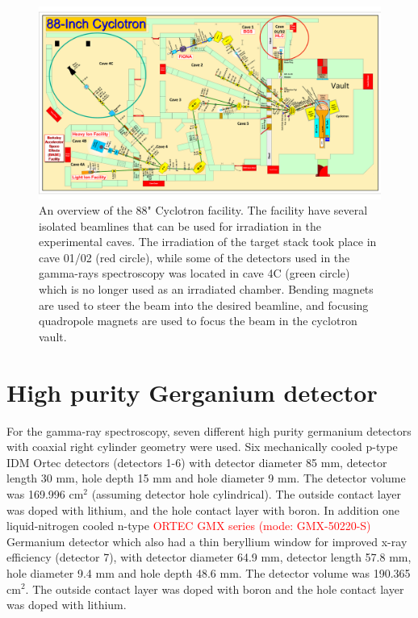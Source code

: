 \begin{figure}
    \centering
    \includegraphics[width=1\textwidth]{Experiment/Control-Room-Map-new.pdf}
    \caption{An overview of the 88" Cyclotron facility. The facility have several isolated beamlines that can be used for irradiation in the experimental caves. The irradiation of the target stack took place in cave 01/02 (red circle), while some of the detectors used in the gamma-rays spectroscopy was located in cave 4C (green circle) which is no longer used as an irradiated chamber. Bending magnets are used to steer the beam into the desired beamline, and focusing quadropole magnets are used to focus the beam in the cyclotron vault. }
    \label{fig:LBNL_88}
\end{figure}

\section{High purity Gerganium detector} \label{sec:detector_calibration}
\noindent  

For the gamma-ray spectroscopy, seven different high purity germanium detectors with coaxial right cylinder geometry were used. Six mechanically cooled p-type IDM Ortec detectors (detectors 1-6) with detector diameter 85 mm, detector length 30 mm, hole depth 15 mm and hole diameter 9 mm. The detector volume was 169.996 cm$^2$ (assuming detector hole cylindrical). The outside contact layer was doped with lithium, and the hole contact layer with boron. In addition one liquid-nitrogen cooled n-type \textcolor{red}{ORTEC GMX series (mode: GMX-50220-S)} Germanium detector which also had a thin beryllium window for improved x-ray efficiency (detector 7), with detector diameter 64.9 mm, detector length 57.8 mm, hole diameter 9.4 mm and hole depth 48.6 mm. The detector volume was 190.365 cm$^{2}$. The outside contact layer was doped with boron and the hole contact layer was doped with lithium. \\


